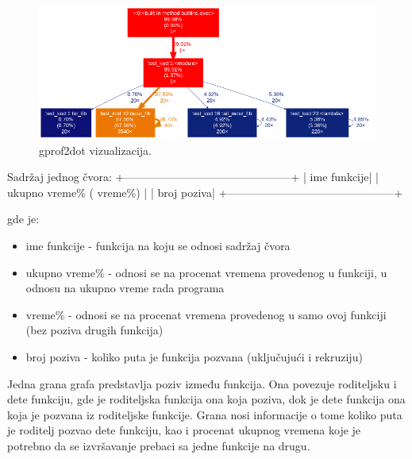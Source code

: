 \documentclass[a4paper]{article}
\begin{document}
\begin{figure}[h!]
\begin{center}
\includegraphics[scale=0.4]{MVJ_02_ProfajleriZaPython_ZecevicSmiljanicMilovanovicPopov/gprof2dot.png}
\end{center}
\caption{gprof2dot vizualizacija.}
\label{fig:gprof2dot_1}
\end{figure}
\begin{center}
\newpage
 Sadržaj jednog čvora: \newline
+---------------------------------------------+ \newline
|\hspace{32pt} ime funkcije\hspace{32.4pt}| \newline
| ukupno vreme\% ( vreme\%) | \newline
|\hspace{34pt} broj poziva\hspace{34.5pt}| \newline
+---------------------------------------------+\newline
\end{center}
gde je:
\begin{itemize}
\item ime funkcije - funkcija na koju se odnosi sadržaj čvora
\item ukupno vreme\% - odnosi se na procenat vremena provedenog u funkciji, u odnosu na ukupno vreme rada programa
\item vreme\% - odnosi se na procenat vremena provedenog u samo ovoj funkciji (bez poziva drugih funkcija)
\item broj poziva - koliko puta je funkcija pozvana (uključujući i rekruziju)
\end{itemize} 
Jedna grana grafa predstavlja poziv između funkcija. Ona povezuje roditeljsku i dete funkciju, gde je roditeljska funkcija ona koja poziva, dok je dete funkcija ona koja je pozvana iz roditeljske funkcije. Grana nosi informacije o tome koliko puta je roditelj pozvao dete funkciju, kao i procenat ukupnog vremena koje je potrebno da se izvršavanje prebaci sa jedne funkcije na drugu.
\end{document}
